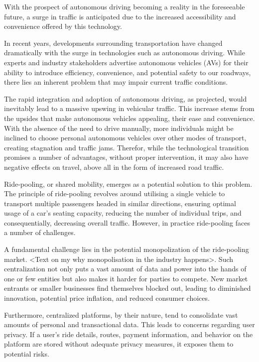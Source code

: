 With the prospect of autonomous driving becoming a reality in the foreseeable future, a surge in traffic is anticipated due to the increased accessibility and convenience offered by this technology.

In recent years, developments surrounding transportation have changed dramatically with the surge in technologies such as autonomous driving. While experts and industry stakeholders advertise autonomous vehicles (AVs) for their ability to introduce efficiency, convenience, and potential safety to our roadways, there lies an inherent problem that may impair current traffic conditions.

The rapid integration and adoption of autonomous driving, as projected, would inevitably lead to a massive upswing in vehicular traffic. This increase stems from the upsides that make autonomous vehicles appealing, their ease and convenience. With the absence of the need to drive manually, more individuals might be inclined to choose personal autonomous vehicles over other modes of transport, creating stagnation and traffic jams. Therefor, while the technological transition promises a number of advantages, without proper intervention, it may also have negative effects on  travel, above all in the form of  increased road traffic.

Ride-pooling, or shared mobility, emerges as a potential solution to this problem. The principle of ride-pooling revolves around utilising a single vehicle to transport multiple passengers headed in similar directions, ensuring optimal usage of a car's seating capacity, reducing the number of individual trips, and consequentially, decreasing overall traffic. However, in practice ride-pooling faces a number of challenges.

A fundamental challenge lies in the potential monopolization of the ride-pooling market. <Text on my why monopolisation in the industry happens>. Such centralization not only puts a vast amount of data and power into the hands of one or few entities but also makes it harder for parties to compete. New market entrants or smaller businesses find themselves blocked out, leading to diminished innovation, potential price inflation, and reduced consumer choices.

Furthermore, centralized platforms, by their nature, tend to consolidate vast amounts of personal and transactional data. This leads to concerns regarding user privacy. If a user’s ride details, routes, payment information, and behavior on the platform are stored without adequate privacy measures, it exposes them to potential risks.


